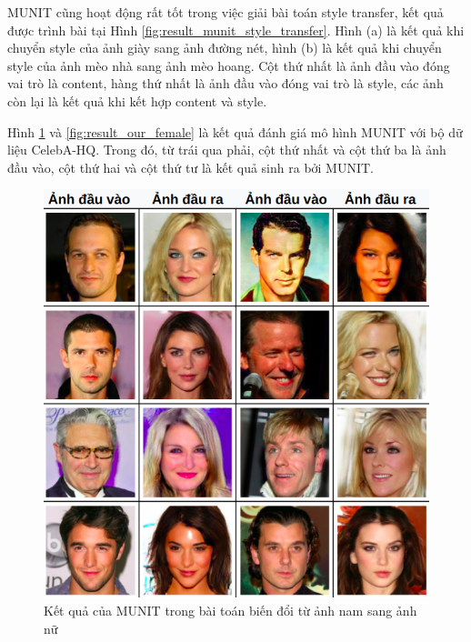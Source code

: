 {    \noindent MUNIT cũng hoạt động rất tốt trong việc giải bài toán style transfer, kết quả được trình bài tại Hình \ref{fig:result_munit_style_transfer}. Hình (a) là kết quả khi chuyển style của ảnh giày sang ảnh đường nét, hình (b) là kết quả khi chuyển style của ảnh mèo nhà sang ảnh mèo hoang. Cột thứ nhất là ảnh đầu vào đóng vai trò là content, hàng thứ nhất là ảnh đầu vào đóng vai trò là style, các ảnh còn lại là kết quả khi kết hợp content và style.
    
    \noindent Hình \ref{fig:result_our_male} và \ref{fig:result_our_female} là kết quả đánh giá mô hình MUNIT với bộ dữ liệu CelebA-HQ. Trong đó, từ trái qua phải, cột thứ nhất và cột thứ ba là ảnh đầu vào, cột thứ hai và cột thứ tư là kết quả sinh ra bởi MUNIT.

    \begin{figure}[H]
    \centering
    \includegraphics[width=12cm] {images/result_our_male.png}
    \caption{Kết quả của MUNIT trong bài toán biến đổi từ ảnh nam sang ảnh nữ}
    \label{fig:result_our_male}
    \end{figure}
    
}

